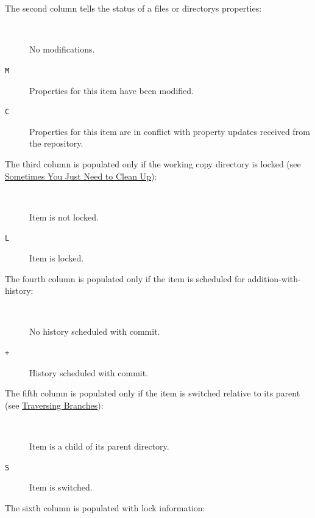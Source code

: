 The second column tells the status of a file\textquotesingle s or
directory\textquotesingle s properties:

\begin{description}
\item[\texttt{\textquotesingle{}\ \textquotesingle{}}]
No modifications.
\item[\texttt{\textquotesingle{}M\textquotesingle{}}]
Properties for this item have been modified.
\item[\texttt{\textquotesingle{}C\textquotesingle{}}]
Properties for this item are in conflict with property updates received
from the repository.
\end{description}

The third column is populated only if the working copy directory is
locked (see \hyperref[svn.tour.cleanup]{Sometimes You Just Need to Clean
Up}):

\begin{description}
\item[\texttt{\textquotesingle{}\ \textquotesingle{}}]
Item is not locked.
\item[\texttt{\textquotesingle{}L\textquotesingle{}}]
Item is locked.
\end{description}

The fourth column is populated only if the item is scheduled for
addition-with-history:

\begin{description}
\item[\texttt{\textquotesingle{}\ \textquotesingle{}}]
No history scheduled with commit.
\item[\texttt{\textquotesingle{}+\textquotesingle{}}]
History scheduled with commit.
\end{description}

The fifth column is populated only if the item is switched relative to
its parent (see \hyperref[svn.branchmerge.switchwc]{Traversing
Branches}):

\begin{description}
\item[\texttt{\textquotesingle{}\ \textquotesingle{}}]
Item is a child of its parent directory.
\item[\texttt{\textquotesingle{}S\textquotesingle{}}]
Item is switched.
\end{description}

The sixth column is populated with lock information:

